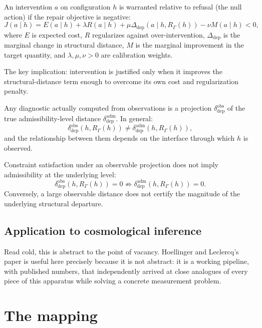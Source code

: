\documentclass[11pt]{article}
\newcommand{\RGam}{R_\Gamma}
\newcommand{\Ddep}{\Delta_{\mathrm{dep}}}
\newcommand{\Repobj}{J}
\newcommand{\dobs}{\delta_{\mathrm{dep}}^{\mathrm{obs}}}
\newcommand{\dadm}{\delta_{\mathrm{dep}}^{\mathrm{adm}}}
\begin{document}
\begin{definition}
An intervention $a$ on configuration $h$ is warranted relative to refusal (the null action) if the repair objective is negative:
\[
\Repobj(a\mid h) = E(a\mid h) + \lambda R(a\mid h) + \mu \Ddep(a\mid h, \RGam(h)) - \nu M(a\mid h) < 0,
\]
where $E$ is expected cost, $R$ regularizes against over-intervention, $\Ddep$ is the marginal change in structural distance, $M$ is the marginal improvement in the target quantity, and $\lambda, \mu, \nu > 0$ are calibration weights.
\end{definition}

The key implication: intervention is justified only when it improves the structural-distance term enough to overcome its own cost and regularization penalty.

\begin{definition}
Any diagnostic actually computed from observations is a projection $\dobs$ of the true admissibility-level distance $\dadm$. In general:
\[
\dobs(h, \RGam(h)) \neq \dadm(h, \RGam(h)),
\]
and the relationship between them depends on the interface through which $h$ is observed.
\end{definition}

\begin{proposition}
Constraint satisfaction under an observable projection does not imply admissibility at the underlying level:
\[
\dobs(h, \RGam(h)) = 0 \not\Rightarrow \dadm(h, \RGam(h)) = 0.
\]
Conversely, a large observable distance does not certify the magnitude of the underlying structural departure.
\end{proposition}

\subsection{Application to cosmological inference}

Read cold, this is abstract to the point of vacancy. Hoellinger and Leclercq's paper is useful here precisely because it is not abstract: it is a working pipeline, with published numbers, that independently arrived at close analogues of every piece of this apparatus while solving a concrete measurement problem.

\section{The mapping}
\end{document}
